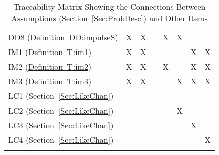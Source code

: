 \documentclass[12pt]{article}
\begin{document}
\begin{longtable}{l l l l l l l l}
DD8 (\hyperref[DD:impulseS]{Definition~DD:impulseS}) & X & X &  & X & X &  & 
\\
IM1 (\hyperref[T:im1]{Definition~T:im1}) & X & X &  &  &  & X & X
\\
IM2 (\hyperref[T:im2]{Definition~T:im2}) & X & X &  & X &  & X & X
\\
IM3 (\hyperref[T:im3]{Definition~T:im3}) & X & X &  &  & X & X & X
\\
LC1 (Section~\ref{Sec:LikeChan}) &  &  &  &  &  &  & 
\\
LC2 (Section~\ref{Sec:LikeChan}) &  &  &  &  & X &  & 
\\
LC3 (Section~\ref{Sec:LikeChan}) &  &  &  &  &  & X & 
\\
LC4 (Section~\ref{Sec:LikeChan}) &  &  &  &  &  &  & X
\\
\bottomrule
\caption{Traceability Matrix Showing the Connections Between Assumptions (Section~\ref{Sec:ProbDesc}) and Other Items}
\label{Table:TracMatrShowtheConnBetwAssu()andOtheItem}
\end{longtable}
\end{document}
